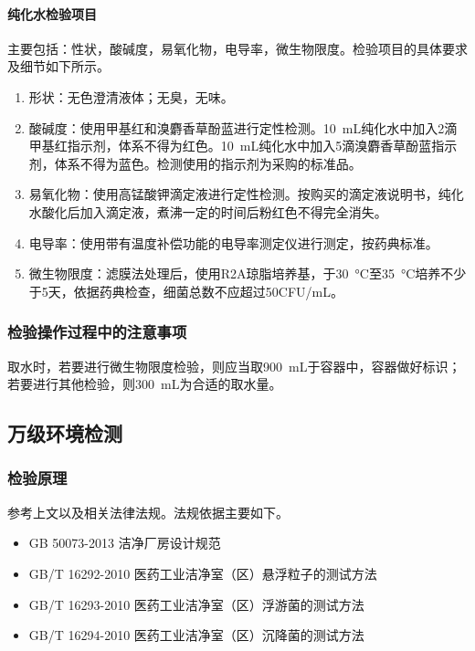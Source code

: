 \paragraph{纯化水检验项目} 主要包括：性状，酸碱度，易氧化物，电导率，微生物限度。检验项目的具体要求及细节如下所示。
\begin{enumerate}
    \item 形状：无色澄清液体；无臭，无味。
    \item 酸碱度：使用甲基红和溴麝香草酚蓝进行定性检测。\SI{10}{\milli\liter}纯化水中加入2滴甲基红指示剂，体系不得为红色。\SI{10}{\milli\liter}纯化水中加入5滴溴麝香草酚蓝指示剂，体系不得为蓝色。检测使用的指示剂为采购的标准品。
    \item 易氧化物：使用高锰酸钾滴定液进行定性检测。按购买的滴定液说明书，纯化水酸化后加入滴定液，煮沸一定的时间后粉红色不得完全消失。
    \item 电导率：使用带有温度补偿功能的电导率测定仪进行测定，按药典标准。
    \item 微生物限度：滤膜法处理后，使用R2A琼脂培养基，于\SI{30}{\celsius}至\SI{35}{\celsius}培养不少于5天，依据药典检查，细菌总数不应超过50CFU/mL。
\end{enumerate}

\subsubsection{检验操作过程中的注意事项}
取水时，若要进行微生物限度检验，则应当取\SI{900}{\milli\liter}于容器中，容器做好标识；若要进行其他检验，则\SI{300}{\milli\liter}为合适的取水量。

\subsection{万级环境检测}

\subsubsection{检验原理}
参考上文以及相关法律法规。法规依据主要如下。
\begin{itemize}
    \item GB 50073-2013 洁净厂房设计规范
    \item GB/T 16292-2010 医药工业洁净室（区）悬浮粒子的测试方法
    \item GB/T 16293-2010 医药工业洁净室（区）浮游菌的测试方法
    \item GB/T 16294-2010 医药工业洁净室（区）沉降菌的测试方法
\end{itemize}

